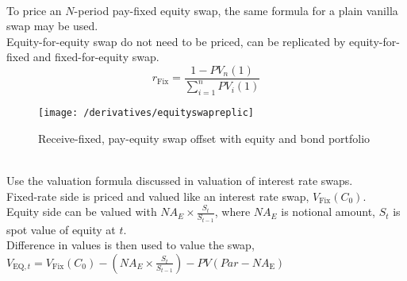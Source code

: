 \begin{remark} \\
To price an $N$-period pay-fixed equity swap, the same formula for a plain vanilla swap may be used.\\
Equity-for-equity swap do not need to be priced, can be replicated by equity-for-fixed and fixed-for-equity swap. 
\begin{equation}
r_{\text{Fix}} = \frac{1 - PV_{n}(1)}{\sum\limits_{i=1}^n PV_{i}(1)} \nonumber
\end{equation}
\end{remark}

\begin{figure}[H]
\centering
\texttt{[image: /derivatives/equityswapreplic]}
\caption{Receive-fixed, pay-equity swap offset with equity and bond portfolio}
\end{figure}

\begin{method} \\
Use the valuation formula discussed in valuation of interest rate swaps.\\
Fixed-rate side is priced and valued like an interest rate swap, $V_{\text{Fix}}(C_0)$.\\
Equity side can be valued with $NA_E \times \frac{S_{t}}{S_{t-1}}$, where $NA_E$ is notional amount, $S_t$ is spot value of equity at $t$.\\
Difference in values is then used to value the swap, $V_{\text{EQ},t} = V_{\text{Fix}}(C_0) - (NA_E \times \frac{S_{t}}{S_{t-1}}) - PV(Par-NA_{\text{E}})$
\end{method}

